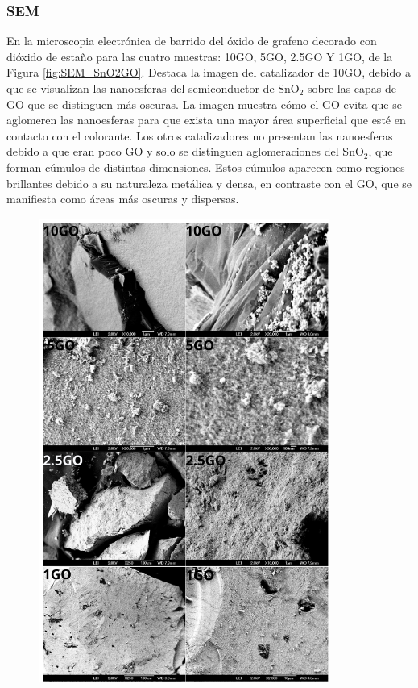 \documentclass[12pt]{article}
\begin{document}
        
\subsubsection{SEM}

En la microscopia electrónica de barrido del óxido de grafeno decorado con dióxido de estaño para las cuatro muestras: 10GO, 5GO, 2.5GO Y 1GO, de la Figura \ref{fig:SEM_SnO2GO}. Destaca la imagen del catalizador de 10GO, debido a que se visualizan las nanoesferas del semiconductor de SnO$\displaystyle _{2}$ sobre las capas de GO que se distinguen más oscuras. La imagen muestra cómo el GO evita que se aglomeren las nanoesferas para que exista una mayor área superficial que esté en contacto con el colorante. Los otros catalizadores no presentan las nanoesferas debido a que eran poco GO y solo se distinguen aglomeraciones del SnO$\displaystyle _{2}$, que forman cúmulos de distintas dimensiones. Estos cúmulos aparecen como regiones brillantes debido a su naturaleza metálica y densa, en contraste con el GO, que se manifiesta como áreas más oscuras y dispersas.

\begin{figure}[H]
    	   \begin{center}
     	  	\includegraphics[width = 0.85\textwidth]{Imagenes/SEM_SnO2GO.png}
    	   \end{center} 
        \end{figure}
\end{document}
